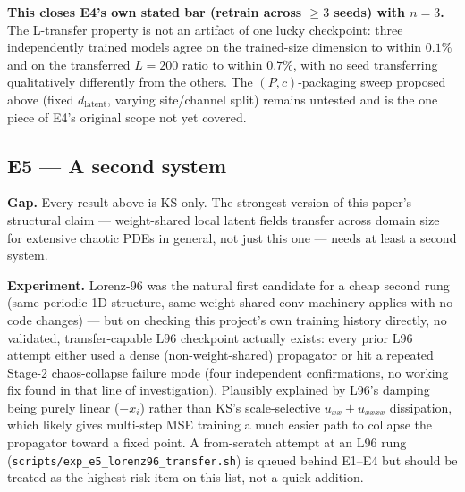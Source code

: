 \documentclass[11pt]{article}
\newcommand{\dlat}{d_{\mathrm{latent}}}
\begin{document}
\textbf{This closes E4's own stated bar (retrain across $\geq 3$
seeds) with $n=3$.} The L-transfer property is not an artifact of one
lucky checkpoint: three independently trained models agree on the
trained-size dimension to within $0.1\%$ and on the transferred
$L=200$ ratio to within $0.7\%$, with no seed transferring
qualitatively differently from the others. The $(P,c)$-packaging sweep
proposed above (fixed $\dlat$, varying site/channel split) remains
untested and is the one piece of E4's original scope not yet covered.

\subsection{E5 --- A second system}
\label{exp:e5}

\textbf{Gap.} Every result above is KS only. The strongest version of
this paper's structural claim --- weight-shared local latent fields
transfer across domain size for extensive chaotic PDEs in general, not
just this one --- needs at least a second system.

\textbf{Experiment.} Lorenz-96 was the natural first candidate for a
cheap second rung (same periodic-1D structure, same
weight-shared-conv machinery applies with no code changes) --- but on
checking this project's own training history directly, no validated,
transfer-capable L96 checkpoint actually exists: every prior L96
attempt either used a dense (non-weight-shared) propagator or hit a
repeated Stage-2 chaos-collapse failure mode (four independent
confirmations, no working fix found in that line of investigation).
Plausibly explained by L96's damping being purely linear
($-x_i$) rather than KS's scale-selective $u_{xx}+u_{xxxx}$
dissipation, which likely gives multi-step MSE training a much easier
path to collapse the propagator toward a fixed point. A from-scratch
attempt at an L96 rung (\texttt{scripts/exp\_e5\_lorenz96\_transfer.sh})
is queued behind E1--E4 but should be treated as the highest-risk item
on this list, not a quick addition.
\end{document}
